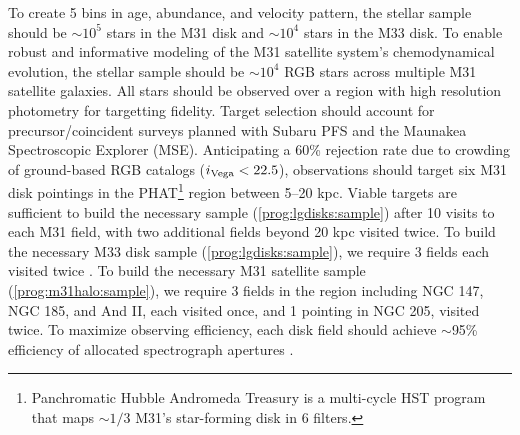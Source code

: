 \documentclass[11pt,a4paper,twoside,onecolumn,openany,final,oldfontcommands]{memoir}
\begin{document}
\begin{programrequirement}
\reqitem To create 5 bins in age, abundance, and velocity pattern, the stellar sample should be $\sim 10^5$ stars in the M31 disk and $\sim 10^4$ stars in the M33 disk. \label{prog:lgdisks:sample}
\reqitem To enable robust and informative modeling of the M31 satellite system's chemodynamical evolution, the stellar sample should be $\sim10^{4}$ RGB stars across multiple M31 satellite galaxies.  \label{prog:m31halo:sample}
\reqitem All stars should be observed over a region with high resolution photometry for targetting fidelity.
\reqitem Target selection should account for precursor/coincident surveys planned with Subaru PFS and the Maunakea Spectroscopic Explorer (MSE).
\reqitem Anticipating a 60\% rejection rate \citep{dorman12} due to crowding of ground-based RGB catalogs ($i_{\rm Vega} < 22.5$), observations should target six M31 disk pointings in the PHAT\footnote{Panchromatic Hubble Andromeda Treasury \citep{phat} is a multi-cycle HST program that maps $\sim1/3$ M31's star-forming disk in 6 filters.} region between 5--20 kpc.  Viable targets are sufficient to build the necessary sample (\ref{prog:lgdisks:sample}) after 10 visits to each M31 field, with two additional fields beyond 20 kpc visited twice.
\reqitem To build the necessary M33 disk sample (\ref{prog:lgdisks:sample}), we require 3 fields each visited twice .
\reqitem To build the necessary M31 satellite sample (\ref{prog:m31halo:sample}), we require 3 fields in the region including NGC 147, NGC 185, and And II, each visited once, and 1 pointing in NGC 205, visited twice.
\reqitem To maximize observing efficiency, each disk field should achieve $\sim$95\% efficiency of allocated spectrograph apertures .
\end{programrequirement}
\end{document}
